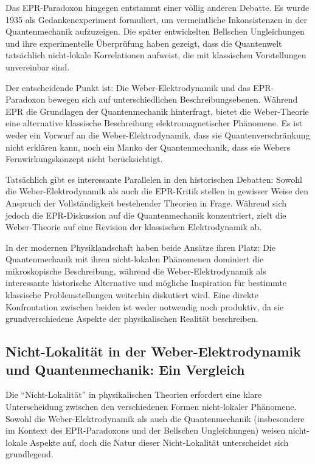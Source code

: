 Das EPR-Paradoxon hingegen entstammt einer völlig anderen Debatte. Es wurde 1935 als Gedankenexperiment formuliert, um vermeintliche Inkonsistenzen in der Quantenmechanik aufzuzeigen.
Die später entwickelten Bellschen Ungleichungen und ihre experimentelle Überprüfung haben gezeigt, dass die Quantenwelt tatsächlich nicht-lokale Korrelationen aufweist, die mit
klassischen Vorstellungen unvereinbar sind.

Der entscheidende Punkt ist: Die Weber-Elektrodynamik und das EPR-Paradoxon bewegen sich auf unterschiedlichen Beschreibungsebenen. Während EPR die Grundlagen der Quantenmechanik hinterfragt,
bietet die Weber-Theorie eine alternative klassische Beschreibung elektromagnetischer Phänomene. Es ist weder ein Vorwurf an die Weber-Elektrodynamik, dass sie Quantenverschränkung nicht
erklären kann, noch ein Manko der Quantenmechanik, dass sie Webers Fernwirkungskonzept nicht berücksichtigt.

Tatsächlich gibt es interessante Parallelen in den historischen Debatten: Sowohl die Weber-Elektrodynamik als auch die EPR-Kritik stellen in gewisser Weise den Anspruch der Vollständigkeit
bestehender Theorien in Frage. Während sich jedoch die EPR-Diskussion auf die Quantenmechanik konzentriert, zielt die Weber-Theorie auf eine Revision der klassischen Elektrodynamik ab.

In der modernen Physiklandschaft haben beide Ansätze ihren Platz: Die Quantenmechanik mit ihren nicht-lokalen Phänomenen dominiert die mikroskopische Beschreibung, während
die Weber-Elektrodynamik als interessante historische Alternative und mögliche Inspiration für bestimmte klassische Problemstellungen weiterhin diskutiert wird. Eine direkte Konfrontation
zwischen beiden ist weder notwendig noch produktiv, da sie grundverschiedene Aspekte der physikalischen Realität beschreiben.

\subsection{Nicht-Lokalität in der Weber-Elektrodynamik und Quantenmechanik: Ein Vergleich}
Die \enquote{Nicht-Lokalität} in physikalischen Theorien erfordert eine klare Unterscheidung zwischen den verschiedenen Formen nicht-lokaler Phänomene. Sowohl die Weber-Elektrodynamik
als auch die Quantenmechanik (insbesondere im Kontext des EPR-Paradoxons und der Bellschen Ungleichungen) weisen nicht-lokale Aspekte auf, doch die Natur dieser Nicht-Lokalität unterscheidet
sich grundlegend.

